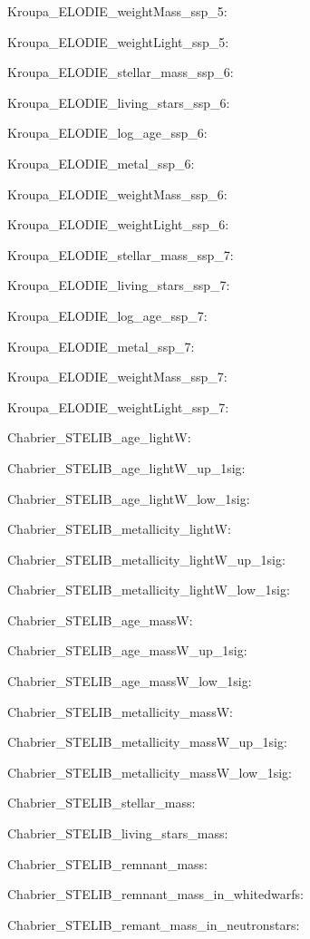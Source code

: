 \item Kroupa\_ELODIE\_weightMass\_ssp\_5: 
\item Kroupa\_ELODIE\_weightLight\_ssp\_5: 
\item Kroupa\_ELODIE\_stellar\_mass\_ssp\_6: 
\item Kroupa\_ELODIE\_living\_stars\_ssp\_6: 
\item Kroupa\_ELODIE\_log\_age\_ssp\_6: 
\item Kroupa\_ELODIE\_metal\_ssp\_6: 
\item Kroupa\_ELODIE\_weightMass\_ssp\_6: 
\item Kroupa\_ELODIE\_weightLight\_ssp\_6: 
\item Kroupa\_ELODIE\_stellar\_mass\_ssp\_7: 
\item Kroupa\_ELODIE\_living\_stars\_ssp\_7: 
\item Kroupa\_ELODIE\_log\_age\_ssp\_7: 
\item Kroupa\_ELODIE\_metal\_ssp\_7: 
\item Kroupa\_ELODIE\_weightMass\_ssp\_7: 
\item Kroupa\_ELODIE\_weightLight\_ssp\_7: 
\item Chabrier\_STELIB\_age\_lightW: 
\item Chabrier\_STELIB\_age\_lightW\_up\_1sig: 
\item Chabrier\_STELIB\_age\_lightW\_low\_1sig: 
\item Chabrier\_STELIB\_metallicity\_lightW: 
\item Chabrier\_STELIB\_metallicity\_lightW\_up\_1sig: 
\item Chabrier\_STELIB\_metallicity\_lightW\_low\_1sig: 
\item Chabrier\_STELIB\_age\_massW: 
\item Chabrier\_STELIB\_age\_massW\_up\_1sig: 
\item Chabrier\_STELIB\_age\_massW\_low\_1sig: 
\item Chabrier\_STELIB\_metallicity\_massW: 
\item Chabrier\_STELIB\_metallicity\_massW\_up\_1sig: 
\item Chabrier\_STELIB\_metallicity\_massW\_low\_1sig: 
\item Chabrier\_STELIB\_stellar\_mass: 
\item Chabrier\_STELIB\_living\_stars\_mass: 
\item Chabrier\_STELIB\_remnant\_mass: 
\item Chabrier\_STELIB\_remnant\_mass\_in\_whitedwarfs: 
\item Chabrier\_STELIB\_remant\_mass\_in\_neutronstars: 
